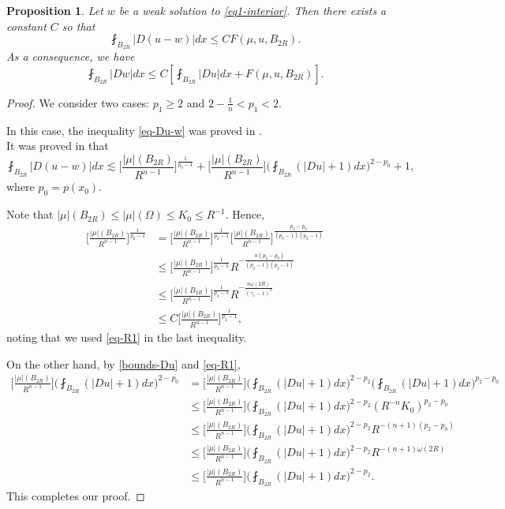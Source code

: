 \documentclass[a4paper,10pt]{amsart}
\newtheorem{prop}[thm]{Proposition}
\newcommand{\lesi}{\lesssim}
\newcommand{\f}{\frac}
\newcommand{\om}{\omega}
\newcommand{\Om}{\Omega}
\begin{document}
\begin{prop}
	\label{prop1-interior}
	Let $w$ be a weak solution to \eqref{eq1-interior}. Then there exists a constant $C$  so that
	\begin{equation}
	\label{eq-Du-w}
	\fint_{B_{2R}}|D(u-w)|dx \leq CF(\mu,u,B_{2R}).
	\end{equation}
	As a consequence, we have
	\begin{equation}
	\label{eq1-Dw}
	\fint_{B_{2R}}|Dw| dx\leq C\left[ \fint_{B_{2R}}|Du| dx+F(\mu,u,B_{2R}) \right].
	\end{equation}
\end{prop}
\begin{proof}
	We consider two cases: $p_1\geq 2$ and $2-\f{1}{n}<p_1<2$.
	
	 In this case, the inequality \eqref{eq-Du-w} was proved in \cite[pp. 651--652]{BH}.\\
	
	
	 It was proved in \cite[Lemma 5.1]{BaH} that
	 $$
	\fint_{B_{2R}}|D(u-w)|dx\lesi \Big[\f{|\mu|(B_{2R})}{R^{n-1}}\Big]^{\f{1}{p_0-1}} +\Big[\f{|\mu|(B_{2R})}{R^{n-1}}\Big]\Big(\fint_{B_{2R}}(|Du|+1)dx\Big)^{2-p_0}+1,
	 $$ 
	where $p_0=p(x_0)$.
	
	Note that $|\mu|(B_{2R})\leq |\mu|(\Om)\leq K_0\leq R^{-1}$. Hence,
	$$
	\begin{aligned}
	\Big[\f{|\mu|(B_{2R})}{R^{n-1}}\Big]^{\f{1}{p_0-1}}&=\Big[\f{|\mu|(B_{2R})}{R^{n-1}}\Big]^{\f{1}{p_2-1}}\Big[\f{|\mu|(B_{2R})}{R^{n-1}}\Big]^{\f{p_2-p_0}{(p_0-1)(p_2-1)}}\\
	&\leq \Big[\f{|\mu|(B_{2R})}{R^{n-1}}\Big]^{\f{1}{p_2-1}}R^{-\f{n(p_2-p_0)}{(p_0-1)(p_2-1)}}\\
	&\leq \Big[\f{|\mu|(B_{2R})}{R^{n-1}}\Big]^{\f{1}{p_2-1}}R^{-\f{n\om(2R)}{(\gamma_1-1)^2}}\\
	&\leq C\Big[\f{|\mu|(B_{2R})}{R^{n-1}}\Big]^{\f{1}{p_2-1}},
	\end{aligned}
	$$
	noting that we used \eqref{eq-R1}  in the last inequality.
	
	On the other hand, by \eqref{bounds-Du} and \eqref{eq-R1},
	$$
	\begin{aligned}
	\Big[\f{|\mu|(B_{2R})}{R^{n-1}}\Big]\Big(\fint_{B_{2R}}(|Du|+1)dx\Big)^{2-p_0}&=\Big[\f{|\mu|(B_{2R})}{R^{n-1}}\Big]\Big(\fint_{B_{2R}}(|Du|+1)dx\Big)^{2-p_2}\Big(\fint_{B_{2R}}(|Du|+1)dx\Big)^{p_2-p_0}\\
	&\leq \Big[\f{|\mu|(B_{2R})}{R^{n-1}}\Big]\Big(\fint_{B_{2R}}(|Du|+1)dx\Big)^{2-p_2}(R^{-n}K_0)^{p_2-p_0}\\
	&\leq \Big[\f{|\mu|(B_{2R})}{R^{n-1}}\Big]\Big(\fint_{B_{2R}}(|Du|+1)dx\Big)^{2-p_2}R^{-(n+1)(p_2-p_0)}\\
	&\leq \Big[\f{|\mu|(B_{2R})}{R^{n-1}}\Big]\Big(\fint_{B_{2R}}(|Du|+1)dx\Big)^{2-p_2}R^{-(n+1)\om(2R)}\\
	&\leq \Big[\f{|\mu|(B_{2R})}{R^{n-1}}\Big]\Big(\fint_{B_{2R}}(|Du|+1)dx\Big)^{2-p_2}.
	\end{aligned}
	$$
	This completes our proof.
\end{proof}
\end{document}
